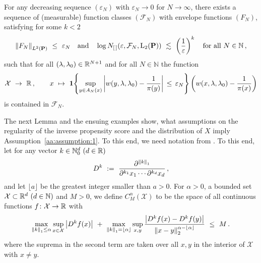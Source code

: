 \begin{assumption}
  \label{aa:assumption:1}
  For any decreasing sequence
  $(\varepsilon_N)$ with $\varepsilon_N\to 0$ for $N\to\infty$,
there exists a sequence of (measurable) function classes
$(\mathcal{F}_N)$
with envelope functions
$(F_N)$,
satisfying 
for some $k<2$
\begin{gather*}
\norm{F_N}_{L^2(\P)}
\ 
\le
\ 
\varepsilon_N
\quad
\text{and}
\quad
  \log
  N_{[\,]}(\varepsilon,\mathcal{F}_N,\mathrm{L}_2(\P))
  \ 
  \lesssim
  \ 
  \left( 
  \frac{1}{\varepsilon}
  \right)^k
  \quad
  \text{for all}
  \ 
  N\in\mathbb{N}
  \,,
\end{gather*}
such that for all $(\lambda,\lambda_0)\in\mathbb{R}^{N+1}$ and for all $N\in\mathbb{N}$ the function
\begin{gather}
  \label{ghost_function}
  \mathcal{X}
  \ 
  \to
  \ 
  \R
  \,,
  \qquad
  x
  \ 
  \mapsto
  \ 
  \mathbf{1}{
    \left\{ 
      \sup_{y\in A_N(x)}
      \left| 
      w(y,\lambda,\lambda_0)
      -
      \frac{1}{\pi(y)}
      \right|
      \,
      \le
      \,
      \varepsilon_N
    \right\}
  }
  \left( 
      w(x,\lambda,\lambda_0)
      -
      \frac{1}{\pi(x)}
  \right)
\end{gather}
is contained in $\mathcal{F}_N$.
\end{assumption}
The next Lemma and the ensuing examples show, what assumptions on the regularity of the inverse propensity score and the distribution of $X$ imply Assumption~\ref{aa:assumption:1}.
To this end, we need notation from \cite[§2.7.1]{vaart2013}.
To this end, let for any vector $k\in\mathbb{N}_0^d \ (d\in\mathbb{R})$
\begin{gather*}
  D^k
  \ :=\ 
  \frac
  {\partial^{\norm{k}_1}}
  {
    \partial^{k_1}x_1
    \cdots
    \partial^{k_d}x_d
  }
  \,,
\end{gather*}
and let $\lfloor a \rfloor$ be the greatest integer smaller than $a>0$.
For $\alpha>0$, a bounded set 
$\mathcal{X}\subset\R^d\ (d\in\mathbb{N})$
and
$M>0$, we define $C^\alpha_M(\mathcal{X})$ to be the space of all continuous functions $f\colon \mathcal{X}\to\mathbb{R}$ with
\begin{gather*}
  \max_{\norm{k}_1\le \alpha}\sup_{x\in\mathcal{X}}
  \left| D^k f(x) \right|
  \ 
  +
  \ 
  \max_{\norm{k}_1=\lfloor \alpha \rfloor}\sup_{x,y}
  \frac
  {
  \left|
  D^k f(x) 
  -
  D^k f(y) 
  \right|
  }
  {
    \norm{x-y}_2^{\alpha-\lfloor \alpha \rfloor}
  }
  \
  \le
  \ 
  M
  \,.
\end{gather*}
where the suprema in the second term are taken over all $x,y$ in the interior of $\mathcal{X}$ with $x\neq y$.
